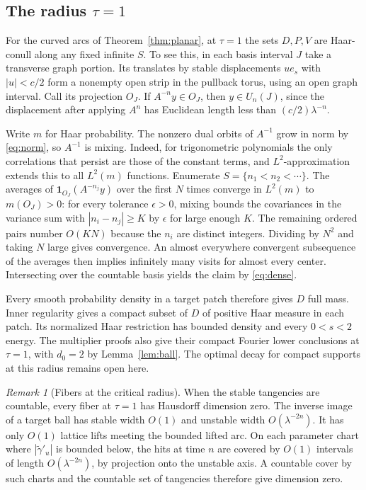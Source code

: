 \documentclass[11pt,a4paper,reqno]{amsart}
\theoremstyle{definition}
\theoremstyle{remark}
\newtheorem{remark}[theorem]{Remark}
\numberwithin{equation}{section}
\begin{document}
\subsection{The radius \texorpdfstring{\(\tau=1\)}{tau = 1}}
For the curved arcs of Theorem~\ref{thm:planar}, at \(\tau=1\) the
sets \(D,P,V\) are Haar-conull along any fixed infinite \(S\). To see
this, in each basis interval \(J\) take a transverse graph portion.
Its translates by stable displacements \(u e_s\) with \(|u|<c/2\)
form a nonempty open strip in the pullback torus, using an open
graph interval. Call its projection \(O_J\). If \(A^{-n}y\in O_J\),
then \(y\in U_n(J)\), since the displacement after applying \(A^n\)
has Euclidean length less than \((c/2)\lambda^{-n}\).

Write \(m\) for Haar probability. The nonzero dual orbits of \(A^{-1}\)
grow in norm by \eqref{eq:norm}, so \(A^{-1}\) is mixing. Indeed, for
trigonometric polynomials the only correlations that persist are
those of the constant terms, and \(L^2\)-approximation extends this
to all \(L^2(m)\) functions. Enumerate \(S=\{n_1<n_2<\cdots\}\).
The averages of \(\mathbf 1_{O_J}(A^{-n_j}y)\) over the first \(N\)
times converge in \(L^2(m)\) to \(m(O_J)>0\): for every tolerance
\(\epsilon>0\), mixing bounds the covariances in the variance sum
with \(|n_i-n_j|\ge K\) by \(\epsilon\) for large enough \(K\).
The remaining ordered pairs number \(O(KN)\) because the \(n_i\)
are distinct integers. Dividing by \(N^2\) and taking \(N\) large
gives convergence. An almost everywhere convergent subsequence of
the averages then implies infinitely many visits for almost every
center. Intersecting over the countable basis yields the claim by
\eqref{eq:dense}.

Every smooth probability density in a target patch therefore gives
\(D\) full mass. Inner regularity gives a compact subset of \(D\) of
positive Haar measure in each patch. Its normalized Haar restriction
has bounded density and every \(0<s<2\) energy. The multiplier proofs
also give their compact Fourier lower conclusions at \(\tau=1\),
with \(d_0=2\) by Lemma~\ref{lem:ball}. The optimal decay for compact
supports at this radius remains open here.

\begin{remark}[Fibers at the critical radius]
When the stable tangencies are countable, every fiber at \(\tau=1\)
has Hausdorff dimension zero. The inverse image of a target ball has
stable width \(O(1)\) and unstable width \(O(\lambda^{-2n})\).
It has only \(O(1)\) lattice lifts meeting the bounded lifted arc.
On each parameter chart where \(|\widetilde\gamma'_u|\) is bounded
below, the hits at time \(n\) are covered by \(O(1)\) intervals of
length \(O(\lambda^{-2n})\), by projection onto the unstable axis.
A countable cover by such charts and the countable set of
tangencies therefore give dimension zero.
\end{remark}
\end{document}
